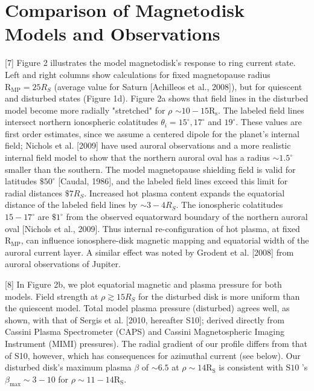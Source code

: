 \documentclass[10pt]{article}
\begin{document}
\section{Comparison of Magnetodisk Models and Observations}
[7] Figure 2 illustrates the model magnetodisk's response to ring current state. Left and right columns show calculations for fixed magnetopause radius $\mathrm{R}_{\mathrm{MP}}=25 R_{S}$ (average value for Saturn [Achilleos et al., 2008]), but for quiescent and disturbed states (Figure 1d). Figure 2a shows that field lines in the disturbed model become more radially "stretched" for $\rho$ $\sim 10-15 \mathrm{R}_{\mathrm{s}}$. The labeled field lines intersect northern ionospheric colatitudes $\theta_{i}=15^{\circ}, 17^{\circ}$ and $19^{\circ}$. These values are first order estimates, since we assume a centered dipole for the planet's internal field; Nichols et al. [2009] have used auroral observations and a more realistic internal field model to show that the northern auroral oval has a radius $\sim 1.5^{\circ}$ smaller than the southern. The model magnetopause shielding field is valid for latitudes $\$ 50^{\circ}$ [Caudal, 1986], and the labeled field lines exceed this limit for radial distances $\$ 7 R_{S}$. Increased hot plasma content expands the equatorial distance of the labeled field lines by $\sim 3-4 R_{S}$. The ionospheric colatitudes $15-17^{\circ}$ are $\$ 1^{\circ}$ from the observed equatorward boundary of the northern auroral oval [Nichols et al., 2009]. Thus internal re-configuration of hot plasma, at fixed $\mathrm{R}_{\mathrm{MP}}$, can influence ionosphere-disk magnetic mapping and equatorial width of the auroral current layer. A similar effect was noted by Grodent et al. [2008] from auroral observations of Jupiter.

[8] In Figure 2b, we plot equatorial magnetic and plasma pressure for both models. Field strength at $\rho \gtrsim 15 R_{S}$ for the disturbed disk is more uniform than the quiescent model. Total model plasma pressure (disturbed) agrees well, as shown, with that of Sergis et al. [2010, hereafter S10]; derived directly from Cassini Plasma Spectrometer (CAPS) and Cassini Magnetospheric Imaging Instrument (MIMI) pressures). The radial gradient of our profile differs from that of S10, however, which has consequences for azimuthal current (see below). Our disturbed disk's maximum plasma $\beta$ of $\sim 6.5$ at $\rho \sim 14 \mathrm{R}_{\mathrm{S}}$ is consistent with $\mathrm{S} 10$ 's $\beta_{\max } \sim 3-10$ for $\rho \sim 11-14 \mathrm{R}_{\mathrm{S}}$.
\end{document}
